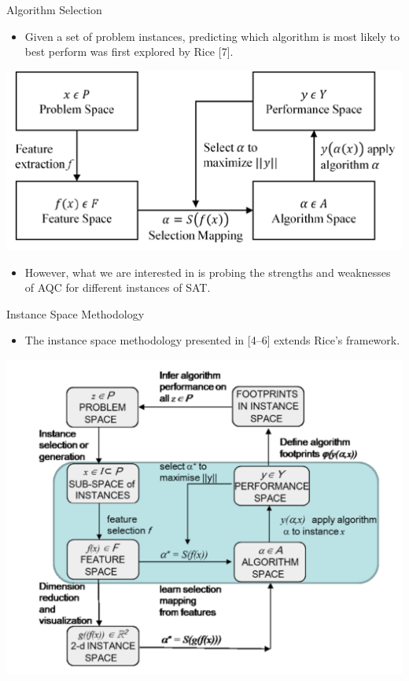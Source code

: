 \documentclass[
  ignorenonframetext,
]{beamer}
\providecommand{\tightlist}{%
  \setlength{\itemsep}{0pt}\setlength{\parskip}{0pt}}
\begin{document}
\begin{frame}{Algorithm Selection}
\protect\hypertarget{algorithm-selection}{}

\begin{itemize}[<+->]
\tightlist
\item
  Given a set of problem instances, predicting which algorithm is most
  likely to best perform was first explored by Rice {[}7{]}. \pause
\end{itemize}

\begin{center}\includegraphics[width=0.6\linewidth]{./rices-framework-for-algorithm-selection} \end{center}

\begin{itemize}[<+->]
\tightlist
\item
  However, what we are interested in is probing the strengths and
  weaknesses of AQC for different instances of SAT.
\end{itemize}

\end{frame}

\begin{frame}{Instance Space Methodology}
\protect\hypertarget{instance-space-methodology}{}

\begin{itemize}[<+->]
\tightlist
\item
  The instance space methodology presented in {[}4--6{]} extends Rice's
  framework. \pause
\end{itemize}

\begin{center}\includegraphics[width=0.6\linewidth]{./instance-space-methodology} \end{center}

\end{frame}
\end{document}
